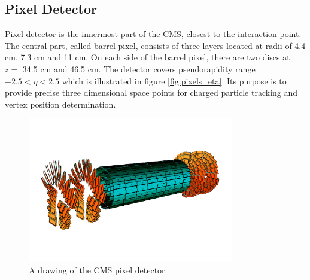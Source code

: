 \subsection{Pixel Detector}

Pixel detector is the innermost part of the CMS, closest to the interaction point. The central part, called barrel pixel, consists of three layers located at radii of 4.4 cm, 7.3 cm and 11 cm. On each side of the barrel pixel, there are two discs at $z=$ 34.5 cm and 46.5 cm. The detector covers pseudorapidity range $-2.5<\eta<2.5$ which is illustrated in figure \ref{fig:pixels_eta}. Its purpose is to provide precise three dimensional space points for charged particle tracking and vertex position determination.
\begin{figure}[htbp]
	\centering
		\includegraphics[width=0.8\textwidth]{Figures/pixel_detector.png}
	\caption[CMS Pixel Detector]{A drawing of the CMS pixel detector. \cite{Chatrchyan:2008aa}}
	\label{fig:pixels}
\end{figure}
